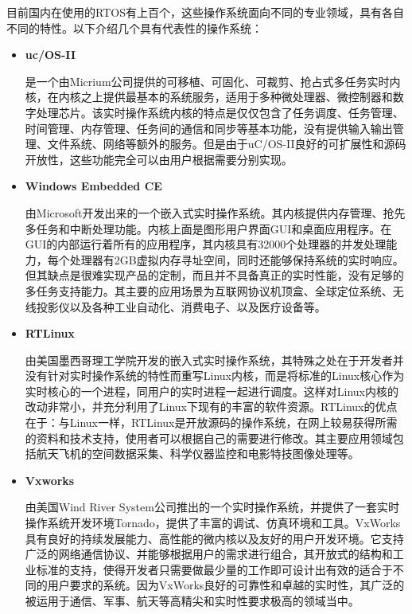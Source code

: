 	目前国内在使用的RTOS有上百个，这些操作系统面向不同的专业领域，具有各自不同的特性。以下介绍几个具有代表性的操作系统：
\begin{itemize}
\item \textbf{uc/OS-II}
	
	是一个由Micrium公司提供的可移植、可固化、可裁剪、抢占式多任务实时内核，在内核之上提供最基本的系统服务，适用于多种微处理器、微控制器和数字处理芯片。该实时操作系统内核的特点是仅仅包含了任务调度、任务管理、时间管理、内存管理、任务间的通信和同步等基本功能，没有提供输入输出管理、文件系统、网络等额外的服务。但是由于uC/OS-II良好的可扩展性和源码开放性，这些功能完全可以由用户根据需要分别实现。
	
\item \textbf{Windows Embedded CE}

	由Microsoft开发出来的一个嵌入式实时操作系统。其内核提供内存管理、抢先多任务和中断处理功能。内核上面是图形用户界面GUI和桌面应用程序。在GUI的内部运行着所有的应用程序，其内核具有32000个处理器的并发处理能力，每个处理器有2GB虚拟内存寻址空间，同时还能够保持系统的实时响应\cite{WindowsEmbeddedCE6.0}。但其缺点是很难实现产品的定制，而且并不具备真正的实时性能，没有足够的多任务支持能力。其主要的应用场景为互联网协议机顶盒、全球定位系统、无线投影仪以及各种工业自动化、消费电子、以及医疗设备等。
	
\item \textbf{RTLinux}
	
	由美国墨西哥理工学院开发的嵌入式实时操作系统，其特殊之处在于开发者并没有针对实时操作系统的特性而重写Linux内核，而是将标准的Linux核心作为实时核心的一个进程，同用户的实时进程一起进行调度。这样对Linux内核的改动非常小，并充分利用了Linux下现有的丰富的软件资源。RTLinux的优点在于：与Linux一样，RTLinux是开放源码的操作系统，在网上较易获得所需的资料和技术支持，使用者可以根据自己的需要进行修改。其主要应用领域包括航天飞机的空间数据采集、科学仪器监控和电影特技图像处理等。
	
\item \textbf{Vxworks}

	由美国Wind River System公司推出的一个实时操作系统，并提供了一套实时操作系统开发环境Tornado，提供了丰富的调试、仿真环境和工具。VxWorks具有良好的持续发展能力、高性能的微内核以及友好的用户开发环境。它支持广泛的网络通信协议、并能够根据用户的需求进行组合，其开放式的结构和工业标准的支持，使得开发者只需要做最少量的工作即可设计出有效的适合于不同的用户要求的系统。因为VxWorks良好的可靠性和卓越的实时性，其广泛的被运用于通信、军事、航天等高精尖和实时性要求极高的领域当中。	
\end{itemize}	
		
